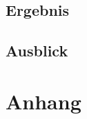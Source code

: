 \documentclass[12pt,             %
               a4paper,          %
               listof=totoc,     %
               index=totoc,      %
               bibliography=totoc,%
               oneside,         %
               BCOR1cm,          %
               english   %
               ]{scrbook}
\begin{document}
\section{Ergebnis}
\section{Ausblick}

\clearpage
\chapter{Anhang}

\newpage
\listoffigures

\newpage
\listoftables

\newpage
\lstlistoflistings

\newpage

\end{document}
